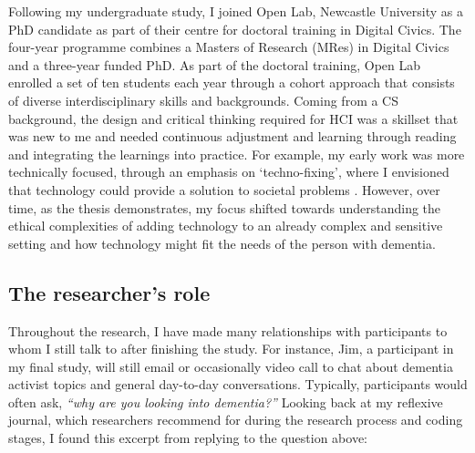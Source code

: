 Following my undergraduate study, I joined Open Lab, Newcastle University as a PhD candidate as part of their centre for doctoral training in Digital Civics. The four-year programme combines a Masters of Research (MRes) in Digital Civics and a three-year funded PhD. As part of the doctoral training, Open Lab enrolled a set of ten students each year through a cohort approach that consists of diverse interdisciplinary skills and backgrounds. Coming from a CS background, the design  and critical thinking required for HCI was a skillset that was new to me and needed continuous adjustment and learning through reading and integrating the learnings into practice. For example, my early work was more technically focused, through an emphasis on `techno-fixing', where I envisioned that technology could provide a solution to societal problems \citep{jongsma2017usual}. However, over time, as the thesis demonstrates, my focus shifted towards understanding the ethical complexities of adding technology to an already complex and sensitive setting and how technology might fit the needs of the person with dementia.

\subsection{The researcher's role}
\label{Reflexivity:Questions}
Throughout the research, I have made many relationships with participants to whom I still talk to after finishing the study. For instance, Jim, a participant in my final study, will still email or occasionally video call to chat about dementia activist topics and general day-to-day conversations. Typically, participants would often ask, \textit{``why are you looking into dementia?''} Looking back at my reflexive journal, which researchers recommend for during the research process and coding stages, I found this excerpt from  replying to the question above:

